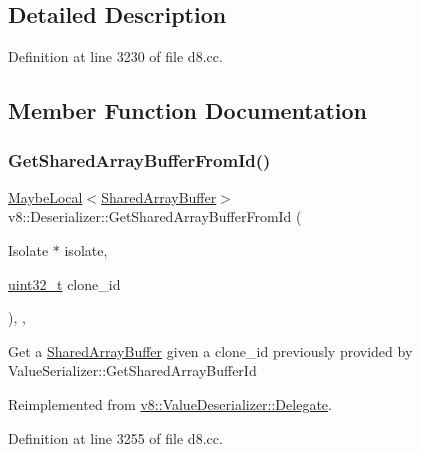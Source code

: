 \subsection{Detailed Description}


Definition at line 3230 of file d8.\+cc.



\subsection{Member Function Documentation}
\mbox{\label{classv8_1_1Deserializer_a2a0c866dd14f5482bf5e131dcd181bd5}} 
\subsubsection{\texorpdfstring{Get\+Shared\+Array\+Buffer\+From\+Id()}{GetSharedArrayBufferFromId()}}
{\footnotesize\ttfamily \mbox{\hyperlink{classv8_1_1MaybeLocal}{Maybe\+Local}}$<$\mbox{\hyperlink{classv8_1_1SharedArrayBuffer}{Shared\+Array\+Buffer}}$>$ v8\+::\+Deserializer\+::\+Get\+Shared\+Array\+Buffer\+From\+Id (\begin{DoxyParamCaption}\item[{Isolate $\ast$}]{isolate,  }\item[{\mbox{\hyperlink{classuint32__t}{uint32\+\_\+t}}}]{clone\+\_\+id }\end{DoxyParamCaption})\hspace{0.3cm}{\ttfamily [inline]}, {\ttfamily [override]}, {\ttfamily [virtual]}}

Get a \mbox{\hyperlink{classv8_1_1SharedArrayBuffer}{Shared\+Array\+Buffer}} given a clone\+\_\+id previously provided by Value\+Serializer\+::\+Get\+Shared\+Array\+Buffer\+Id 

Reimplemented from \mbox{\hyperlink{classv8_1_1ValueDeserializer_1_1Delegate_afaffdb0ab5dd659ae89377d5e9b6cbf7}{v8\+::\+Value\+Deserializer\+::\+Delegate}}.



Definition at line 3255 of file d8.\+cc.

\mbox{\label{classv8_1_1Deserializer_ad120ac7532b6965d9cefdef29f971661}} 
